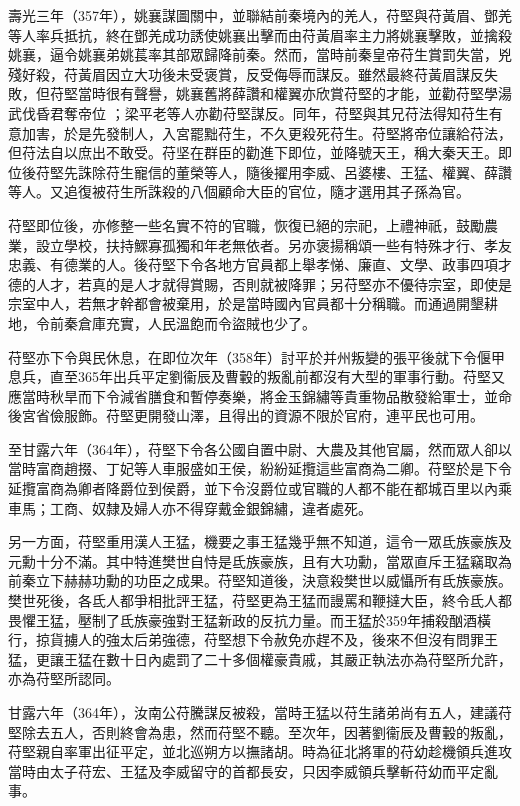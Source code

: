 壽光三年（357年），姚襄謀圖關中，並聯結前秦境內的羌人，苻堅與苻黃眉、鄧羌等人率兵抵抗，終在鄧羌成功誘使姚襄出擊而由苻黃眉率主力將姚襄擊敗，並擒殺姚襄，逼令姚襄弟姚萇率其部眾歸降前秦。然而，當時前秦皇帝苻生賞罰失當，兇殘好殺，苻黃眉因立大功後未受褒賞，反受侮辱而謀反。雖然最終苻黃眉謀反失敗，但苻堅當時很有聲譽，姚襄舊將薛讚和權翼亦欣賞苻堅的才能，並勸苻堅學湯武伐昏君奪帝位 ；梁平老等人亦勸苻堅謀反。同年，苻堅與其兄苻法得知苻生有意加害，於是先發制人，入宮罷黜苻生，不久更殺死苻生。苻堅將帝位讓給苻法，但苻法自以庶出不敢受。苻坚在群臣的勸進下即位，並降號天王，稱大秦天王。即位後苻堅先誅除苻生寵信的董榮等人，隨後擢用李威、呂婆樓、王猛、權翼、薛讚等人。又追復被苻生所誅殺的八個顧命大臣的官位，隨才選用其子孫為官。

苻堅即位後，亦修整一些名實不符的官職，恢復已絕的宗祀，上禮神祇，鼓勵農業，設立學校，扶持鰥寡孤獨和年老無依者。另亦褒揚稱頌一些有特殊才行、孝友忠義、有德業的人。後苻堅下令各地方官員都上舉孝悌、廉直、文學、政事四項才德的人才，若真的是人才就得賞賜，否則就被降罪；另苻堅亦不優待宗室，即使是宗室中人，若無才幹都會被棄用，於是當時國內官員都十分稱職。而通過開墾耕地，令前秦倉庫充實，人民溫飽而令盜賊也少了。

苻堅亦下令與民休息，在即位次年（358年）討平於并州叛變的張平後就下令偃甲息兵，直至365年出兵平定劉衞辰及曹轂的叛亂前都沒有大型的軍事行動。苻堅又應當時秋旱而下令減省膳食和暫停奏樂，將金玉錦繡等貴重物品散發給軍士，並命後宮省儉服飾。苻堅更開發山澤，且得出的資源不限於官府，連平民也可用。

至甘露六年（364年），苻堅下令各公國自置中尉、大農及其他官屬，然而眾人卻以當時富商趙掇、丁妃等人車服盛如王侯，紛紛延攬這些富商為二卿。苻堅於是下令延攬富商為卿者降爵位到侯爵，並下令沒爵位或官職的人都不能在都城百里以內乘車馬；工商、奴隸及婦人亦不得穿戴金銀錦繡，違者處死。

另一方面，苻堅重用漢人王猛，機要之事王猛幾乎無不知道，這令一眾氐族豪族及元勳十分不滿。其中特進樊世自恃是氐族豪族，且有大功勳，當眾直斥王猛竊取為前秦立下赫赫功勳的功臣之成果。苻堅知道後，決意殺樊世以威懾所有氐族豪族。樊世死後，各氐人都爭相批評王猛，苻堅更為王猛而謾罵和鞭撻大臣，終令氐人都畏懼王猛，壓制了氐族豪強對王猛新政的反抗力量。而王猛於359年捕殺酗酒橫行，掠貨擄人的強太后弟強德，苻堅想下令赦免亦趕不及，後來不但沒有問罪王猛，更讓王猛在數十日內處罰了二十多個權豪貴戚，其嚴正執法亦為苻堅所允許，亦為苻堅所認同。

甘露六年（364年），汝南公苻騰謀反被殺，當時王猛以苻生諸弟尚有五人，建議苻堅除去五人，否則終會為患，然而苻堅不聽。至次年，因著劉衞辰及曹轂的叛亂，苻堅親自率軍出征平定，並北巡朔方以撫諸胡。時為征北將軍的苻幼趁機領兵進攻當時由太子苻宏、王猛及李威留守的首都長安，只因李威領兵擊斬苻幼而平定亂事。


